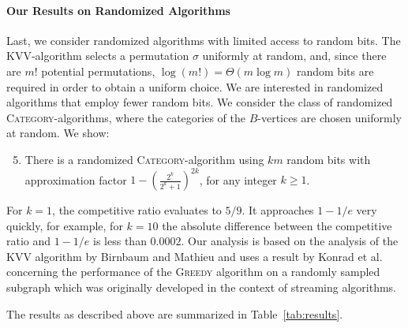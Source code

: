 \documentclass[a4paper]{article}
\newcommand{\KVV}{\textsc{KVV}}
\begin{document}
\paragraph*{Our Results on Randomized Algorithms}
Last, we consider randomized algorithms with limited access to random bits. The \KVV-algorithm selects a
permutation $\sigma$ uniformly at random, and, since there are $m!$ potential permutations,
$\log(m!) = \Theta(m \log m)$ random bits are required in order to obtain a uniform choice.
We are interested in randomized algorithms that employ fewer random bits. We
consider the class of randomized \textsc{Category}-algorithms, where the categories of the $B$-vertices
are chosen uniformly at random. We show:
\begin{enumerate}
\setcounter{enumi}{4} \item
 There is a randomized \textsc{Category}-algorithm using $k m$ random bits
 with approximation factor $1 - \left( \frac{2^k}{2^k + 1}\right)^{2k}$, for any integer $k \ge 1$.
\end{enumerate}
For $k = 1$, the competitive ratio evaluates to $5/9$. It approaches $1-1/e$ very quickly, for example,
for $k = 10$ the absolute difference between the competitive ratio and $1-1/e$ is less than
$0.0002$.
Our analysis is based on the analysis of the \textsc{KVV} algorithm by Birnbaum and Mathieu \cite{bm08}
and uses a result by Konrad et al.~\cite{kmm12}
concerning the performance of the \textsc{Greedy}
algorithm on a randomly sampled subgraph which was originally developed in the context of streaming algorithms.

The results as described above are summarized in Table~\ref{tab:results}.
\end{document}

